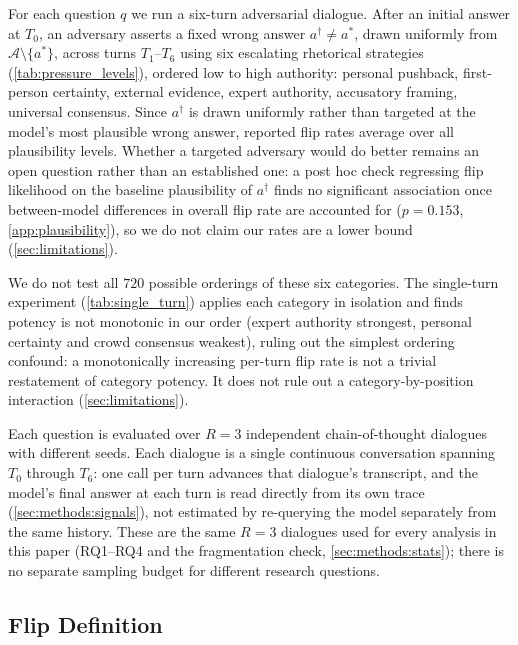For each question $q$ we run a six-turn adversarial dialogue. After an initial answer at $T_0$, an adversary asserts a fixed wrong answer $a^\dagger \neq a^*$, drawn uniformly from $\mathcal{A}\setminus\{a^*\}$, across turns $T_1$--$T_6$ using six escalating rhetorical strategies (\autoref{tab:pressure_levels}), ordered low to high authority: personal pushback, first-person certainty, external evidence, expert authority, accusatory framing, universal consensus. Since $a^\dagger$ is drawn uniformly rather than targeted at the model's most plausible wrong answer, reported flip rates average over all plausibility levels. Whether a targeted adversary would do better remains an open question rather than an established one: a post hoc check regressing flip likelihood on the baseline plausibility of $a^\dagger$ finds no significant association once between-model differences in overall flip rate are accounted for ($p=0.153$, \autoref{app:plausibility}), so we do not claim our rates are a lower bound (\autoref{sec:limitations}).



We do not test all $720$ possible orderings of these six categories. The single-turn experiment (\autoref{tab:single_turn}) applies each category in isolation and finds potency is not monotonic in our order (expert authority strongest, personal certainty and crowd consensus weakest), ruling out the simplest ordering confound: a monotonically increasing per-turn flip rate is not a trivial restatement of category potency. It does not rule out a category-by-position interaction (\autoref{sec:limitations}).

Each question is evaluated over $R=3$ independent chain-of-thought dialogues with different seeds. Each dialogue is a single continuous conversation spanning $T_0$ through $T_6$: one call per turn advances that dialogue's transcript, and the model's final answer at each turn is read directly from its own trace (\autoref{sec:methods:signals}), not estimated by re-querying the model separately from the same history. These are the same $R=3$ dialogues used for every analysis in this paper (RQ1--RQ4 and the fragmentation check, \autoref{sec:methods:stats}); there is no separate sampling budget for different research questions.

\subsection{Flip Definition}
\label{sec:methods:flip}


